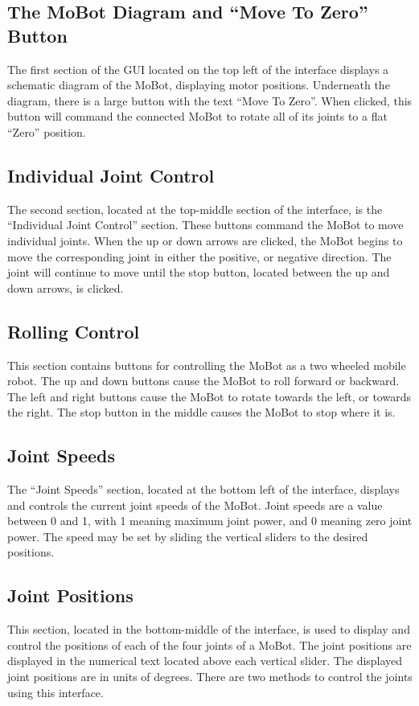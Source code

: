 \documentclass{article}
\begin{document}
\subsection{The MoBot Diagram and ``Move To Zero'' Button}
The first section of the GUI located on the top left of the interface
displays a schematic diagram of the MoBot, displaying motor positions.
Underneath the diagram, there is a large button with the text 
``Move To Zero''. When clicked, this button will command the connected
MoBot to rotate all of its joints to a flat ``Zero'' position.

\subsection{Individual Joint Control}
The second section, located at the top-middle section of the interface,
is the ``Individual Joint Control'' section. These buttons command the
MoBot to move individual joints. When the up or down arrows are clicked,
the MoBot begins to move the corresponding joint in either the positive,
or negative direction. The joint will continue to move until the stop 
button, located between the up and down arrows, is clicked. 

\subsection{Rolling Control}
This section contains buttons for controlling the MoBot as a 
two wheeled mobile robot. The up and down buttons cause the MoBot to
roll forward or backward. The left and right buttons cause the MoBot 
to rotate towards the left, or towards the right. The stop button in the
middle causes the MoBot to stop where it is.

\subsection{Joint Speeds}
The ``Joint Speeds'' section, located at the bottom left of the interface,
displays and controls the current joint speeds of the MoBot. Joint speeds
are a value between 0 and 1, with 1 meaning maximum joint power, and 0
meaning zero joint power. The speed may be set by sliding the vertical 
sliders to the desired positions. 

\subsection{Joint Positions}
This section, located in the bottom-middle of the interface, is used to display
and control the positions of each of the four
joints of a MoBot. The joint positions are displayed in the numerical
text located above each vertical slider. The displayed joint positions are in
units of degrees.  There are two methods to control
the joints using this interface.
\end{document}

